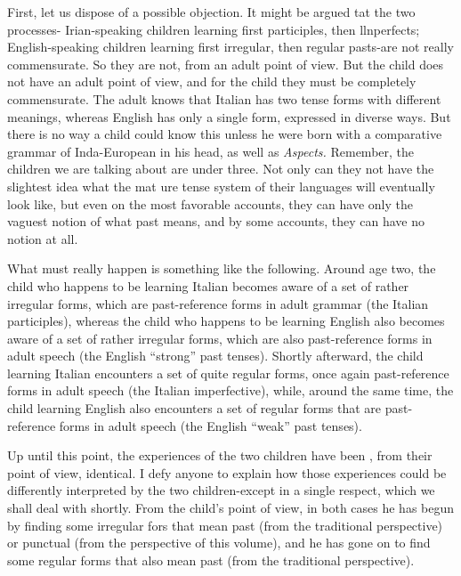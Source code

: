 First, let us dispose of a possible objection. It might be argued tat the two processes- Irian-speaking children learning first parti\-ciples, then llnperfects; English-speaking children learning first irregular, then regular pasts-are not really commensurate. So they are not, from an adult point of view. But the child does not have an adult point of view, and for the child they must be completely commen\-surate. The adult knows that Italian has two tense forms with different meanings, whereas English has only a single form, expressed in diverse ways. But there is no way a child could know this unless he were born with a comparative grammar of Inda-European in his head, as well as \textit{Aspects. }Remember, the children we are talking about are under three. Not only can they not have the slightest idea what the mat ure tense system of their languages will eventually look like, but even on the most favorable accounts, they can have only the vaguest notion of
what past means, and by some accounts, they can have no notion at all.


What must really happen is something like the following. Around age two, the child who happens to be learning Italian becomes aware of a set of rather irregular forms, which are past-reference forms in adult grammar (the Italian participles), whereas the child who happens to be learning English also becomes aware of a set of rather irregular forms, which are also past-reference forms in adult speech (the English ``strong'' past tenses). Shortly afterward, the child learning Italian encounters a set of quite regular forms, once again past-reference forms in adult speech (the Italian imperfective), while, around the same time, the child learning English also encounters a set of regular forms that are past-reference forms in adult speech (the English ``weak'' past tenses).

Up until this point, the experiences of the two children have been , from their point of view, identical. I defy anyone to explain how those experiences could be differently interpreted by the two children-except in a single respect, which we shall deal with shortly. From the child's point of view, in both cases he has begun by finding some irregular fors that mean past (from the traditional perspective) or punctual (from the perspective of this volume), and he has gone on to find some regular forms that also mean past (from the traditional perspective).


